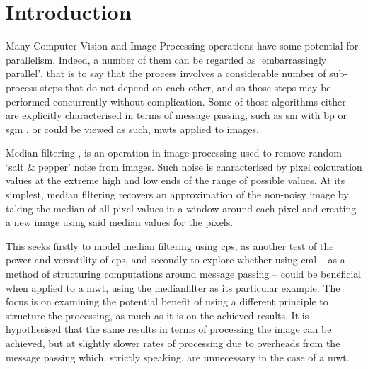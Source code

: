 \section{Introduction}

Many Computer Vision and Image Processing operations have some potential for parallelism.  Indeed, a number of them can be regarded as `embarrassingly parallel', that is to say that the process involves a considerable number of sub-process steps that do not depend on each other, and so those steps may be performed concurrently without complication.  Some of those algorithms either are explicitly characterised in terms of message passing, such as \gls{sm} with \gls{bp} \cite{Liang2011} or \gls{sgm} \cite{Drory2014}, or could be viewed as such, \eg{} \glspl{mwt} applied to images.

Median filtering \cite[Chap. 3.4.1]{Gimelfarb2018}, \cite{Fisher2016} is an operation in image processing used to remove random `salt \& pepper' noise from images.  Such noise is characterised by pixel colouration values at the extreme high and low ends of the range of possible values.  At its simplest, median filtering recovers an approximation of the non-noisy image by taking the median of all pixel values in a window around each pixel and creating a new image using said median values for the pixels.

This  seeks firstly to model median filtering using \gls{cps}, as another test of the power and versatility of \gls{cps}, and secondly to explore whether using \gls{cml} -- as a method of structuring computations around message passing -- could be beneficial when applied to a \gls{mwt}, using the \gls{medianfilter} as its particular example.  The focus is on examining the potential benefit of using a different principle to structure the processing, as much as it is on the achieved results.  It is hypothesised that the same results in terms of processing the image can be achieved, but at slightly slower rates of processing due to overheads from the message passing which, strictly speaking, are unnecessary in the case of a \gls{mwt}.